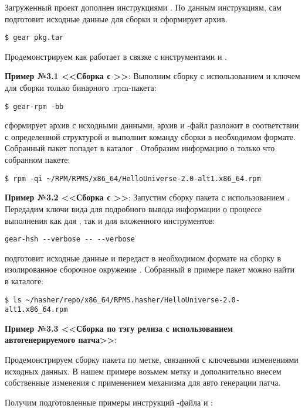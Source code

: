 Загруженный проект дополнен  инструкциями . По данным инструкциям,
 сам подготовит исходные данные для сборки и сформирует архив.
\begin{verbatim}
$ gear pkg.tar
\end{verbatim}

Продемонстрируем как  работает в связке с инструментами 
и .

\textbf{Пример №3.1 <<Сборка с >>}:
Выполним сборку с использованием  и ключем 
для сборки только бинарного {.rpm}-пакета:
\begin{verbatim}
$ gear-rpm -bb
\end{verbatim}

 сформирует архив с исходными данными, архив и -файл разложит в
соответствии с определенной структурой и выполнит команду сборки в необходимом формате.
Собранный пакет попадет в каталог . Отобразим информацию
о только что собранном пакете:
\begin{verbatim}
$ rpm -qi ~/RPM/RPMS/x86_64/HelloUniverse-2.0-alt1.x86_64.rpm
\end{verbatim}

\textbf{Пример №3.2 <<Сборка с >>}:
Запустим сборку пакета с использованием . Передадим ключи вида
 для подробного вывода информации о процессе выполнения
как для , так и для вложенного  инструментов:
\begin{verbatim}
gear-hsh --verbose -- --verbose
\end{verbatim}

 подготовит исходные данные и передаст в необходимом формате на сборку в
изолированное сборочное окружение .
Собранный в примере пакет можно найти в каталоге:
\begin{verbatim}
$ ls ~/hasher/repo/x86_64/RPMS.hasher/HelloUniverse-2.0-alt1.x86_64.rpm
\end{verbatim}

\textbf{Пример №3.3 <<Сборка по тэгу релиза с использованием автогенерируемого патча>>}:

Продемонстрируем сборку пакета по метке, связанной с ключевыми изменениями исходных
данных. В нашем примере возьмем метку  и дополнительно внесем собственные
изменения с применением механизма  для авто генерации патча.

Получим подготовленные примеры инструкций -файла и :

